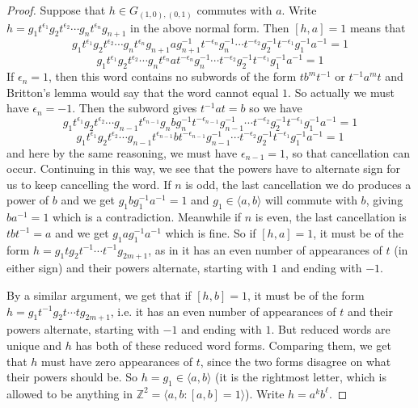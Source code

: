 \documentclass[10pt]{article}
\def\integers{{\mathbb{Z}}}
\theoremstyle{definition}
\begin{document}
\begin{proof}
Suppose that $h\in G_{(1,0),(0,1)}$ commutes with $a$. Write $h=g_1 t^{\epsilon_1} g_2 t^{\epsilon_2}  \cdots g_n t^{\epsilon_n} g_{n+1}$ in the above normal form. Then $[h,a]=1$ means that
$$g_1 t^{\epsilon_1} g_2 t^{\epsilon_2}  \cdots g_n t^{\epsilon_n} g_{n+1} a g_{n+1}^{-1} t^{-\epsilon_n} g_n^{-1} \cdots t^{-\epsilon_2} g_2^{-1} t^{-\epsilon_1} g_1^{-1} a^{-1}=1$$
$$g_1 t^{\epsilon_1} g_2 t^{\epsilon_2}  \cdots g_n t^{\epsilon_n} a  t^{-\epsilon_n} g_n^{-1} \cdots t^{-\epsilon_2} g_2^{-1} t^{-\epsilon_1} g_1^{-1} a^{-1}=1$$
If $\epsilon_n=1$, then this word contains no subwords of the form $t b^{m} t^{-1}$ or $t^{-1} a^{m} t$ and Britton's lemma would say that the word cannot equal $1$. So actually we must have $\epsilon_{n}=-1$. Then the subword gives $t^{-1} a t = b$ so we have
$$g_1 t^{\epsilon_1} g_2 t^{\epsilon_2}  \cdots g_{n-1} t^{\epsilon_{n-1}} g_n b g_n^{-1} t^{-\epsilon_{n-1}} g_{n-1}^{-1} \cdots t^{-\epsilon_2} g_2^{-1} t^{-\epsilon_1} g_1^{-1} a^{-1}=1$$
$$g_1 t^{\epsilon_1} g_2 t^{\epsilon_2}  \cdots g_{n-1} t^{\epsilon_{n-1}} b  t^{-\epsilon_{n-1}} g_{n-1}^{-1} \cdots t^{-\epsilon_2} g_2^{-1} t^{-\epsilon_1} g_1^{-1} a^{-1}=1$$ and here by the same reasoning, we must have $\epsilon_{n-1}=1$, so that cancellation can occur. Continuing in this way, we see that the powers have to alternate sign for us to keep cancelling the word. If $n$ is odd, the last cancellation we do produces a power of $b$ and we get $g_1 b g_1^{-1} a^{-1}=1$ and $g_1\in \langle a,b\rangle$ will commute with $b$, giving $b a^{-1}=1$ which is a contradiction. Meanwhile if $n$ is even, the last cancellation is $t b t^{-1}=a$ and we get $g_1 a g_1^{-1} a^{-1}$ which is fine. So if $[h,a]=1$, it must be of the form $h=g_1 t g_2 t^{-1} \cdots t^{-1} g_{2m+1}$, as in it has an even number of appearances of $t$ (in either sign) and their powers alternate, starting with $1$ and ending with $-1$. 


By a similar argument, we get that if $[h,b]=1$, it must be of the form $h=g_1 t^{-1} g_2 t \cdots t g_{2m+1}$, i.e. it has an even number of appearances of $t$ and their powers alternate, starting with $-1$ and ending with $1$. But reduced words are unique and $h$ has both of these reduced word forms. Comparing them, we get that $h$ must have zero appearances of $t$, since the two forms disagree on what their powers should be. So  $h=g_1 \in \langle a,b\rangle$ (it is the rightmost letter, which is allowed to be anything in $\integers^2 = \langle a,b:[a,b]=1\rangle$). Write $h=a^k b^\ell$. 



\end{proof}
\end{document}

